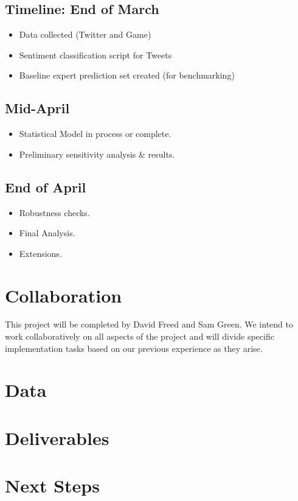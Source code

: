\documentclass[12pt]{article}
\begin{document}
\subsection{Timeline: End of March}
\begin{itemize}
\item Data collected (Twitter and Game)
\item Sentiment classification script for Tweets
\item Baseline expert prediction set created (for benchmarking)
\end{itemize}

\subsection{Mid-April} 
\begin{itemize}
\item Statistical Model in process or complete.
\item Preliminary sensitivity analysis \& results.
\end{itemize}

\subsection{End of April} 
\begin{itemize}
\item Robustness checks.
\item Final Analysis.
\item Extensions.
\end{itemize}

\section{Collaboration}

This project will be completed by David Freed and Sam Green. We intend to work collaboratively on all aspects of the project and will divide specific implementation tasks based on our previous experience as they arise.


\section{Data}

\section{Deliverables}

\section{Next Steps}
\end{document}
